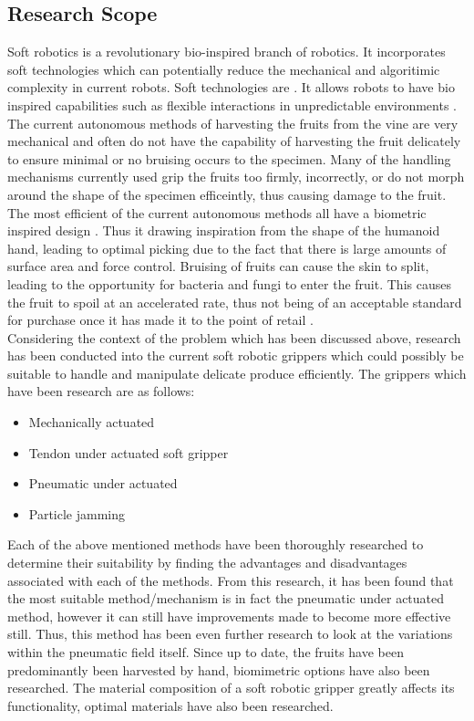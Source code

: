 \documentclass[11pt]{article}
\begin{document}
\subsection{Research Scope}
Soft robotics is a revolutionary bio-inspired branch of robotics. It incorporates soft technologies which can potentially reduce the mechanical and algoritimic complexity in current robots. Soft technologies are . It allows robots to have bio inspired capabilities such as flexible interactions in unpredictable environments \cite{kim2013soft}. The current autonomous methods of harvesting the fruits from the vine are very mechanical and often do not have the capability of harvesting the fruit delicately to ensure minimal or no bruising occurs to the specimen. Many of the handling mechanisms currently used grip the fruits too firmly, incorrectly, or do not morph around the shape of the specimen efficeintly, thus causing damage to the fruit. The most efficient of the current autonomous methods all have a biometric inspired design \cite{hassan2015design}. Thus it drawing inspiration from the shape of the humanoid hand, leading to optimal picking due to the fact that there is large amounts of surface area and force control. Bruising of fruits can cause the skin to split, leading to the opportunity for bacteria and fungi to enter the fruit. This causes the fruit to spoil at an accelerated rate, thus not being of an acceptable standard for purchase once it has made it to the point of retail .
\\
\newline
Considering the context of the problem which has been discussed above, research has been conducted into the current soft robotic grippers which could possibly be suitable to handle and manipulate delicate produce efficiently. The grippers which have been research are as follows:
\begin{itemize}
\item Mechanically actuated
\item Tendon under actuated soft gripper
\item Pneumatic under actuated
\item Particle jamming 
\end{itemize}
Each of the above mentioned methods have been thoroughly researched to determine their suitability by finding the advantages and disadvantages associated with each of the methods. From this research, it has been found that the most suitable method/mechanism is in fact the pneumatic under actuated method, however it can still have improvements made to become more effective still. Thus, this method has been even further research to look at the variations within the pneumatic field itself. Since up to date, the fruits have been predominantly been harvested by hand, biomimetric options have also been researched. The material composition of a soft robotic gripper greatly affects its functionality, optimal materials have also been researched.
\end{document}
